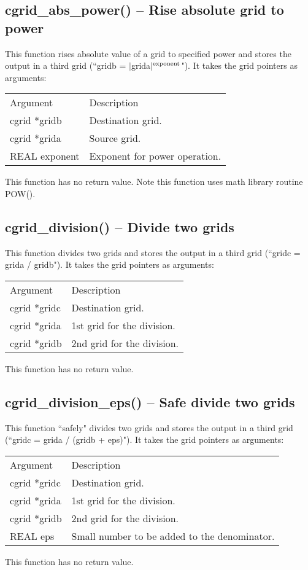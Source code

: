 \documentclass[12pt,letterpaper]{report}
\begin{document}
\subsection{cgrid\_abs\_power() -- Rise absolute grid to power}

This function rises absolute value of a grid to specified power and stores the output in a third grid (``gridb = $|$grida$|^\textnormal{exponent}$"). It takes the grid pointers as arguments:
\begin{longtable}{p{} p{}}
Argument & Description\\
\cline{1-2}
cgrid *gridb & Destination grid.\\
cgrid *grida & Source grid.\\
REAL exponent & Exponent for power operation.\\
\end{longtable}
\noindent
This function has no return value. Note this function uses math library routine POW().

\subsection{cgrid\_division() -- Divide two grids}

This function divides two grids and stores the output in a third grid (``gridc = grida / gridb"). It takes the grid pointers as arguments:
\begin{longtable}{p{} p{}}
Argument & Description\\
\cline{1-2}
cgrid *gridc & Destination grid.\\
cgrid *grida & 1st grid for the division.\\
cgrid *gridb & 2nd grid for the division.\\
\end{longtable}
\noindent
This function has no return value.

\subsection{cgrid\_division\_eps() -- Safe divide two grids}

This function ``safely" divides two grids and stores the output in a third grid (``gridc = grida / (gridb + eps)"). It takes the grid pointers as arguments:
\begin{longtable}{p{} p{}}
Argument & Description\\
\cline{1-2}
cgrid *gridc & Destination grid.\\
cgrid *grida & 1st grid for the division.\\
cgrid *gridb & 2nd grid for the division.\\
REAL eps & Small number to be added to the denominator.\\
\end{longtable}
\noindent
This function has no return value.
\end{document}
